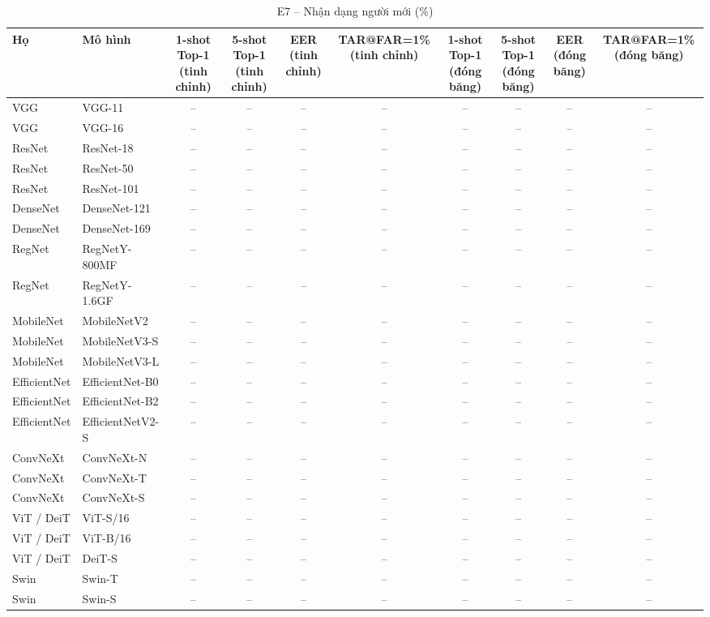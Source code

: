 \begin{table}[t]
\centering
\small
\caption{E7 – Nhận dạng người mới (\%)}
\begin{tabular}{llcccccccc}
\toprule
Họ & Mô hình & 1-shot Top-1 (tinh chỉnh) & 5-shot Top-1 (tinh chỉnh) & EER (tinh chỉnh) & TAR@FAR=1\% (tinh chỉnh) & 1-shot Top-1 (đóng băng) & 5-shot Top-1 (đóng băng) & EER (đóng băng) & TAR@FAR=1\% (đóng băng) \\
\midrule
VGG & VGG-11 & – & – & – & – & – & – & – & – \\
VGG & VGG-16 & – & – & – & – & – & – & – & – \\
ResNet & ResNet-18 & – & – & – & – & – & – & – & – \\
ResNet & ResNet-50 & – & – & – & – & – & – & – & – \\
ResNet & ResNet-101 & – & – & – & – & – & – & – & – \\
DenseNet & DenseNet-121 & – & – & – & – & – & – & – & – \\
DenseNet & DenseNet-169 & – & – & – & – & – & – & – & – \\
RegNet & RegNetY-800MF & – & – & – & – & – & – & – & – \\
RegNet & RegNetY-1.6GF & – & – & – & – & – & – & – & – \\
MobileNet & MobileNetV2 & – & – & – & – & – & – & – & – \\
MobileNet & MobileNetV3-S & – & – & – & – & – & – & – & – \\
MobileNet & MobileNetV3-L & – & – & – & – & – & – & – & – \\
EfficientNet & EfficientNet-B0 & – & – & – & – & – & – & – & – \\
EfficientNet & EfficientNet-B2 & – & – & – & – & – & – & – & – \\
EfficientNet & EfficientNetV2-S & – & – & – & – & – & – & – & – \\
ConvNeXt & ConvNeXt-N & – & – & – & – & – & – & – & – \\
ConvNeXt & ConvNeXt-T & – & – & – & – & – & – & – & – \\
ConvNeXt & ConvNeXt-S & – & – & – & – & – & – & – & – \\
ViT / DeiT & ViT-S/16 & – & – & – & – & – & – & – & – \\
ViT / DeiT & ViT-B/16 & – & – & – & – & – & – & – & – \\
ViT / DeiT & DeiT-S & – & – & – & – & – & – & – & – \\
Swin & Swin-T & – & – & – & – & – & – & – & – \\
Swin & Swin-S & – & – & – & – & – & – & – & – \\

\end{tabular}
\end{table}
